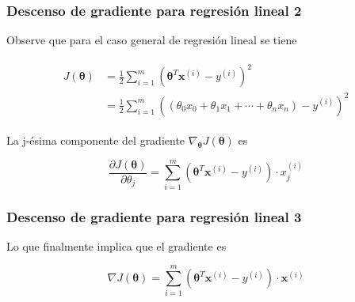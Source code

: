 \documentclass[spanish]{beamer}
\begin{document}
\begin{frame}
\frametitle{Descenso de gradiente para regresión lineal 2}  
Observe que para el caso general de regresión lineal se tiene 

\begin{align*}
\begin{split}
J(\boldsymbol{\theta}) &=  \frac{1}{2} \sum_{i=1}^{m}(\boldsymbol{\theta}^T \boldsymbol{x}^{(i)}-y^{(i)})^2 \\
 &= \frac{1}{2} \sum_{i=1}^{m}\left( (\theta_{0}x_{0}+ \theta_{1}x_{1}+ \cdots + \theta_{n}x_{n} )-y^{(i)}\right) ^2 
\end{split}
\end{align*}

La j-ésima componente del gradiente $\nabla_{\boldsymbol{\theta}}J(\boldsymbol{\theta})$ es 

\begin{equation*}
\frac{\partial J(\boldsymbol{\theta})}{\partial \theta_j}=  \sum_{i=1}^{m} ( \boldsymbol{\theta}^T \boldsymbol{x}^{(i)}-y^{(i)}) \cdot x_{j}^{(i)}
\end{equation*}
\end{frame}
\begin{frame}
\frametitle{Descenso de gradiente para regresión lineal 3}  
Lo que finalmente implica que el gradiente es 

\begin{equation*}
\nabla J(\boldsymbol{\theta}) = \sum_{i=1}^{m} ( \boldsymbol{\theta}^T \boldsymbol{x}^{(i)}-y^{(i)}) \cdot  \boldsymbol{x}^{(i)}
\end{equation*}
\end{frame}
\end{document}
